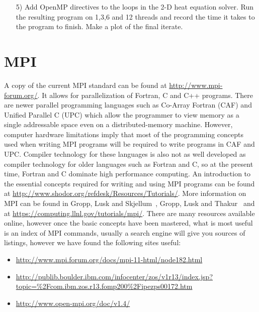 \begin{enumerate}




\item[5)] Add OpenMP directives to the loops in the 2-D heat equation solver. Run the resulting program on 1,3,6 and 12 threads and record the time it takes to the program to finish. Make a plot of the final iterate.
\end{enumerate}
\section{MPI}

A copy of the current MPI standard can be found at \url{http://www.mpi-forum.org/}. It allows for parallelization of Fortran, C and C++ programs. There are newer parallel programming languages such as Co-Array Fortran (CAF) and Unified Parallel C (UPC) which allow the programmer to view memory as a single addressable space even on a distributed-memory machine. However, computer hardware limitations imply that most of the programming concepts used when writing MPI programs will be required to write programs in CAF and UPC. Compiler technology for these languages is also not as well developed as compiler technology for older languages such as Fortran and C, so at the present time, Fortran and C dominate high performance computing.  An introduction to the essential concepts required for writing and using MPI programs can be found at \url{http://www.shodor.org/refdesk/Resources/Tutorials/}. More information on MPI can be found in Gropp, Lusk and Skjellum~\cite{GroLusSkj99}, Gropp, Lusk and Thakur~\cite{GroLusTha99} and at \url{https://computing.llnl.gov/tutorials/mpi/}. There are many resources available online, however once the basic concepts have been mastered, what is most useful is an index of MPI commands, usually a search engine will give you sources of listings, however we have found the following sites useful:
\begin{itemize}
\item \url{http://www.mpi.forum.org/docs/mpi-11-html/node182.html}
\item \url{http://publib.boulder.ibm.com/infocenter/zos/v1r13/index.jsp?topic=\%2Fcom.ibm.zos.r13.fomp200\%2Fipezps00172.htm}
\item \url{http://www.open-mpi.org/doc/v1.4/}
\end{itemize}

